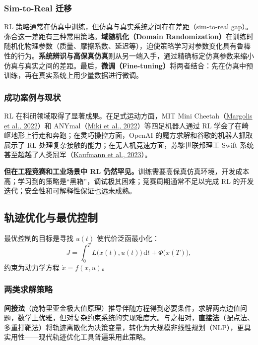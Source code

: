 \subsubsection{Sim-to-Real 迁移}

RL 策略通常在仿真中训练，但仿真与真实系统之间存在差距（sim-to-real gap）。弥合这一差距有三种常用策略。\textbf{域随机化（Domain Randomization）}在训练时随机化物理参数（质量、摩擦系数、延迟等），迫使策略学习对参数变化具有鲁棒性的行为。\textbf{系统辨识与高保真仿真}则从另一端入手，通过精确标定仿真参数来缩小仿真与真实之间的差距。最后，\textbf{微调（Fine-tuning）}将两者结合：先在仿真中预训练，再在真实系统上用少量数据进行微调。

\subsubsection{成功案例与现状}

RL 在科研领域取得了显著成果。在足式运动方面，MIT Mini Cheetah（\href{https://arxiv.org/abs/2208.07855}{Margolis et al., 2022}）和 ANYmal（\href{https://arxiv.org/abs/2109.11978}{Miki et al., 2022}）等四足机器人通过 RL 学会了在崎岖地形上行走和奔跑；在灵巧操控方面，OpenAI 的魔方求解和谷歌的机器人抓取展示了 RL 处理复杂接触的能力；在无人机竞速方面，苏黎世联邦理工 Swift 系统甚至超越了人类冠军（\href{https://arxiv.org/abs/2310.08984}{Kaufmann et al., 2023}）。

\textbf{但在工程竞赛和工业场景中 RL 仍然罕见。}训练需要高保真仿真环境，开发成本高；学习到的策略是``黑箱''，调试极其困难；竞赛周期通常不足以完成 RL 的开发迭代；安全性和可解释性保证也远未成熟。

\subsection{轨迹优化与最优控制}

最优控制的目标是寻找 $u(t)$ 使代价泛函最小化：
\[
J = \int_0^T L\bigl(x(t), u(t)\bigr)\,\mathrm{d}t + \Phi\bigl(x(T)\bigr),
\]
约束为动力学方程 $\dot{x} = f(x, u)$。

\subsubsection{两类求解策略}

\textbf{间接法}（庞特里亚金极大值原理）推导伴随方程得到必要条件，求解两点边值问题，数学上优雅，但对复杂约束系统的实现难度大。与之相对，\textbf{直接法}（配点法、多重打靶法）将轨迹离散化为决策变量，转化为大规模非线性规划（NLP），更具实用性------现代轨迹优化工具普遍采用此策略。

